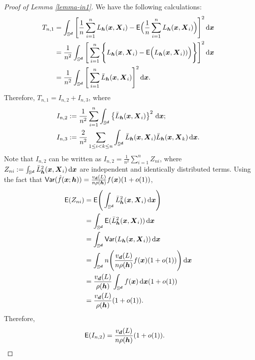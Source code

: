 \documentclass[oneside,11pt]{article}
\begin{document}
\begin{proof}[Proof of Lemma \ref{lemma-in1}]
    We have the following calculations:
    \begin{align*}
    T_{n,1} &= \int_{\Sr} \Bigg[ \frac{1}{n} \sum_{i=1}^{n} L_{\bh} (\bx,\bX_i) - \mathsf{E} \Big( \frac{1}{n} \sum_{i=1}^{n} L_{\bh} (\bx,\bX_i) \Big) \Bigg]^2 \,\rd \bx \\
    &= \frac{1}{n^2} \int_{\Sr} \Bigg[ \sum_{i=1}^{n} \Bigg\{ L_{\bh} (\bx,\bX_i) - \mathsf{E} \Big( L_{\bh} (\bx,\bX_i)) \Big) \Bigg\} \Bigg]^2 \,\rd \bx \\
    &= \frac{1}{n^2} \int_{\Sr} \Bigg[ \sum_{i=1}^{n} \bar{L}_{\bh} (\bx,\bX_i)  \Bigg]^2 \,\rd \bx.
\end{align*}
Therefore, $T_{n,1} = I_{n,2} + I_{n,3}$, where
\begin{align*}
    I_{n,2} &:= \frac{1}{n^2} \sum_{i=1}^{n} \int_{\Sr}  \lrb{\bar{L}_{\bh} (\bx,\bX_i)}^2\,\rd \bx; \\
    I_{n,3} &:= \frac{2}{n^2} \sum_{1 \le i<k \le n} \int_{\Sr} \bar{L}_{\bh} (\bx,\bX_i) \bar{L}_{\bh} (\bx,\bX_k) \,\rd \bx.
\end{align*}
Note that $I_{n,2}$ can be written as $I_{n,2} = \frac{1}{n^2} \sum_{i=1}^{n} Z_{ni}$, where $Z_{ni} \defin \int_{\Sr} \bar{L}_{\bh}^2 (\bx,\bX_i)  \,\rd \bx$ are independent and identically distributed terms. Using the fact that $\mathsf{Var} (\hat{f}(\bx;\bh) )=\frac{v_{\bd}(L)}{n \rho(\bh)} f(\bx)(1 + o(1))$,
\begin{align*}
    \mathsf{E} (Z_{ni}) &= \mathsf{E} \Bigg(\int_{\Sr}  \bar{L}_{\bh}^2 (\bx,\bX_i)  \,\rd \bx \Bigg) \\
    &= \int_{\Sr} \mathsf{E} (  \bar{L}_{\bh}^2 (\bx,\bX_i) ) \,\rd \bx \\
    &= \int_{\Sr} \mathsf{Var} (  L_{\bh} (\bx,\bX_i) ) \,\rd \bx \\
    &= \int_{\Sr} n \Bigg( \frac{v_{\bd}(L)}{n \rho(\bh)} f(\bx) (1+ o(1)) \Bigg) \,\rd \bx \\
    &= \frac{v_{\bd}(L)}{\rho(\bh)} \int_{\Sr} f(\bx) \,\rd \bx(1+ o(1)) \\
    &= \frac{v_{\bd}(L)}{\rho(\bh)} (1+ o(1)).
\end{align*}
Therefore,
\begin{align*}
    \mathsf{E} (I_{n,2}) &=  \frac{v_{\bd}(L)}{n \rho(\bh)} (1+ o(1)).
\end{align*}


\end{proof}
\end{document}
